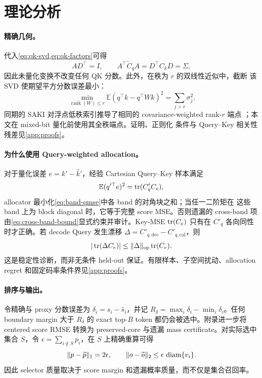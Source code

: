 \section{理论分析}
\label{sec:analysis}

\paragraph{精确几何。}
代入\cref{eq:qk-svd,eq:qk-factors}可得
\begin{equation}
 AD^\top=I,\qquad
 A^\top\widetilde C_qA=D^\top C_kD=\Sigma,
 \label{eq:main-exact-balance}
\end{equation}
因此未量化变换不改变任何 QK 分数。此外，在秩为 $r$ 的双线性近似中，截断
该 SVD 使期望平方分数误差最小：
\begin{equation}
 \min_{\operatorname{rank}(W)\le r}
 \mathbb E(q^\top k-q^\top Wk)^2=\sum_{j>r}\sigma_j^2.
 \label{eq:main-rank-optimal}
\end{equation}
同期的 SAKI 对浮点低秩索引推导了相同的 covariance-weighted rank-$r$ 端点
\citep{zhang2026saki}；本文在 mixed-bit 量化前使用其全秩端点。证明、正则化
条件与 Query--Key 相关性残差见\cref{app:proofs}。

\paragraph{为什么使用 Query-weighted allocation。}
对于量化误差 $e=k'-\widehat k'$，经验 Cartesian Query--Key 样本满足
\begin{equation}
 \mathbb E(q'^\top e)^2=\operatorname{tr}(C'_qC_e),
 \label{eq:main-qmse}
\end{equation}
allocator 最小化\cref{eq:band-qmse}中各 band 的对角块之和；当任一二阶矩在
这些 band 上为 block diagonal 时，它等于完整 score MSE。否则遗漏的
cross-band 项由\cref{eq:cross-band-bound}显式约束并审计。Key-MSE
$\operatorname{tr}(C_e)$ 只有在 $C'_q$ 各向同性时才正确。若 decode Query 发生漂移
$\Delta=C'_{q,\mathrm{dec}}-C'_{q,\mathrm{cal}}$，则
\begin{equation}
 |\operatorname{tr}(\Delta C_e)|\le\|\Delta\|_{\mathrm{op}}\operatorname{tr}(C_e).
 \label{eq:main-drift}
\end{equation}
这是稳定性诊断，而非无条件 held-out 保证。有限样本、子空间扰动、allocation
regret 和固定码率条件界见\cref{app:proofs}。

\paragraph{排序与输出。}
令精确与 proxy 分数误差为 $\delta_i=s_i-\widehat s_i$，并记
$R_\delta=\max_i\delta_i-\min_i\delta_i$。任何 boundary margin 大于
$R_\delta$ 的 exact top-$B$ token 都仍会被选中。附录进一步将 centered score
RMSE 转换为 preserved-core 与遗漏 mass certificate。对实际选中集合 $S$，令
$\epsilon=\sum_{i\notin S}p_i$，在 $S$ 上精确重算可得
\begin{equation}
 \|p-\widetilde p\|_1=2\epsilon,
 \qquad\|o-\widetilde o\|_2\le\epsilon\,\operatorname{diam}\{v_i\}.
 \label{eq:main-output-bound}
\end{equation}
因此 selector 质量取决于 score margin 和遗漏概率质量，而不仅是集合召回率。

